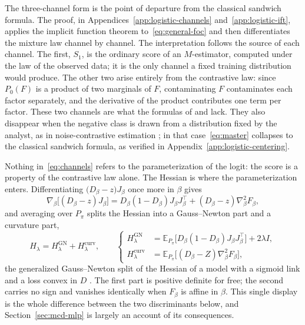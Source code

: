 \documentclass[11pt]{article}
\theoremstyle{plain}
\theoremstyle{definition}
\theoremstyle{remark}
\newcommand{\pE}{\ensuremath{\mathbb{E}}}
\newcommand{\ratio}{\ensuremath{\pi}}
\newcommand{\score}{S}
\begin{document}
The three-channel form is the point of departure from the classical sandwich formula. The
proof, in Appendices~\ref{app:logistic-channels} and~\ref{app:logistic-ift}, applies the
implicit function theorem to~\eqref{eq:general-foc} and then differentiates the mixture law
channel by channel. The interpretation follows the source of each channel. The first,
$\score_1$, is the ordinary score of an $M$-estimator, computed under the law of the observed
data; it is the only channel a fixed training distribution would produce. The other two arise
entirely from the contrastive law: since $P_0(F)$ is a product of two marginals of $F$,
contaminating $F$ contaminates each factor separately, and the derivative of the product
contributes one term per factor. These two channels are what the formulas of
\citet{avella2017} and \citet{kohliang2017} lack. They also disappear when the negative class
is drawn from a distribution fixed by the analyst, as in noise-contrastive estimation
\citep{gutmann2010nce}; in that case~\eqref{eq:master} collapses to the classical sandwich
formula, as verified in Appendix~\ref{app:logistic-centering}.

Nothing in~\eqref{eq:channels} refers to the parameterization of the logit: the score is a
property of the contrastive law alone. The Hessian is where the parameterization enters.
Differentiating $\big(D_\beta-z\big)J_\beta$ once more in $\beta$ gives
\begin{equation}
\nabla_\beta\big[(D_\beta-z)J_\beta\big]
=D_\beta(1-D_\beta)J_\beta J_\beta^\top
+(D_\beta-z)\nabla_\beta^2F_\beta ,
\label{eq:general-hessian-pointwise}
\end{equation}
and averaging over $P_\ratio$ splits the Hessian into a Gauss--Newton part and a curvature
part,
\begin{equation}
H_\lambda=H_\lambda^{\mathrm{GN}}+H_\lambda^{\mathrm{curv}},
\qquad
\left\{
\begin{aligned}
H_\lambda^{\mathrm{GN}} &=\pE_{P_\ratio}\big[D_\beta(1-D_\beta)J_\beta J_\beta^\top\big]+2\lambda I, \\
H_\lambda^{\mathrm{curv}} &=\pE_{P_\ratio}\big[(D_\beta-Z)\nabla_\beta^2F_\beta\big] ,
\end{aligned}
\right.
\label{eq:general-hessian-split}
\end{equation}
the generalized Gauss--Newton split of the Hessian of a model with a sigmoid link and a loss
convex in $D$ \citep{martens2020}. The first part is positive definite for free; the second
carries no sign and vanishes identically when $F_\beta$ is affine in $\beta$. This single
display is the whole difference between the two discriminants below, and
Section~\ref{sec:mcd-mlp} is largely an account of its consequences.
\end{document}
